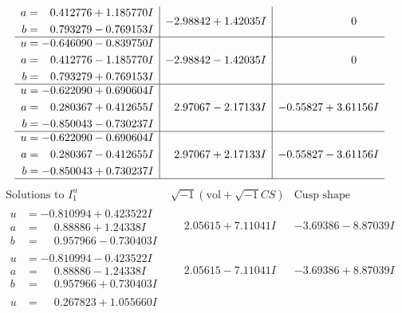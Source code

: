 \documentclass[1p]{elsarticle_modified}
\theoremstyle{definition}
\newcommand{\I}{\sqrt{-1}}
\begin{document}
$$\begin{array}{c|c|c}
\begin{aligned}
a &= \phantom{-}0.412776 + 1.185770 I \\
b &= \phantom{-}0.793279 - 0.769153 I\end{aligned}
 & -2.98842 + 1.42035 I & \phantom{-0.000000 } 0 \\ \hline\begin{aligned}
u &= -0.646090 - 0.839750 I \\
a &= \phantom{-}0.412776 - 1.185770 I \\
b &= \phantom{-}0.793279 + 0.769153 I\end{aligned}
 & -2.98842 - 1.42035 I & \phantom{-0.000000 } 0 \\ \hline\begin{aligned}
u &= -0.622090 + 0.690604 I \\
a &= \phantom{-}0.280367 + 0.412655 I \\
b &= -0.850043 - 0.730237 I\end{aligned}
 & \phantom{-}2.97067 - 2.17133 I & -0.55827 + 3.61156 I \\ \hline\begin{aligned}
u &= -0.622090 - 0.690604 I \\
a &= \phantom{-}0.280367 - 0.412655 I \\
b &= -0.850043 + 0.730237 I\end{aligned}
 & \phantom{-}2.97067 + 2.17133 I & -0.55827 - 3.61156 I\\
 \hline 
 \end{array}$$\newpage$$\begin{array}{c|c|c}  
\text{Solutions to }I^u_{1}& \I (\text{vol} + \sqrt{-1}CS) & \text{Cusp shape}\\
 \hline 
\begin{aligned}
u &= -0.810994 + 0.423522 I \\
a &= \phantom{-}0.88886 + 1.24338 I \\
b &= \phantom{-}0.957966 - 0.730403 I\end{aligned}
 & \phantom{-}2.05615 + 7.11041 I & -3.69386 - 8.87039 I \\ \hline\begin{aligned}
u &= -0.810994 - 0.423522 I \\
a &= \phantom{-}0.88886 - 1.24338 I \\
b &= \phantom{-}0.957966 + 0.730403 I\end{aligned}
 & \phantom{-}2.05615 - 7.11041 I & -3.69386 + 8.87039 I \\ \hline\begin{aligned}
u &= \phantom{-}0.267823 + 1.055660 I \\

\end{aligned}
\end{array}$$
\end{document}
